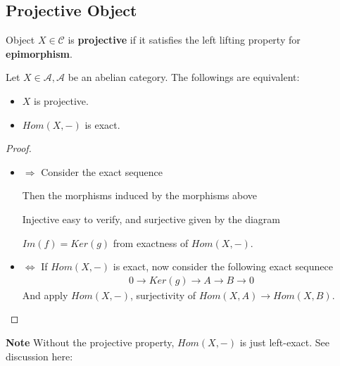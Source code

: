 \documentclass[Total.tex]{subfiles}
\begin{document}
			\subsection{Projective Object}
				\begin{Def}
					Object $X\in \mathcal{C}$ is \textbf{projective} if it satisfies the left lifting property for \textbf{epimorphism}.
					\begin{center}
					\end{center}
				\end{Def}
				\begin{proposition}
					Let $X\in \mathcal{A},\mathcal{A}$ be an abelian category. The followings are equivalent:
					\begin{itemize}
						\item $X$ is projective.
						\item $Hom(X,-)$ is exact.
					\end{itemize}
				\end{proposition}
				\begin{proof}
					\begin{itemize}
						\item $\Rightarrow$ Consider the exact sequence
						\begin{center}
						\end{center}
						Then the morphisms induced by the morphisms above
						\begin{center}
						\end{center}
						Injective easy to verify, and surjective given by the diagram
						\begin{center}
						\end{center}
						
						$Im(f)=Ker(g)$ from exactness of $Hom(X,-)$.
						\item $\Leftrightarrow$ If $Hom(X,-)$ is exact, now consider the following exact sequnece
						\begin{gather*}
							0\rightarrow Ker(g)\rightarrow A\rightarrow B\rightarrow 0
						\end{gather*}
						And apply $Hom(X,-)$, surjectivity of $Hom(X,A)\rightarrow Hom(X,B)$.
					\end{itemize}
				\end{proof}
				\textbf{Note} Without the projective property, $Hom(X,-)$ is just left-exact. See discussion here:
\end{document}
